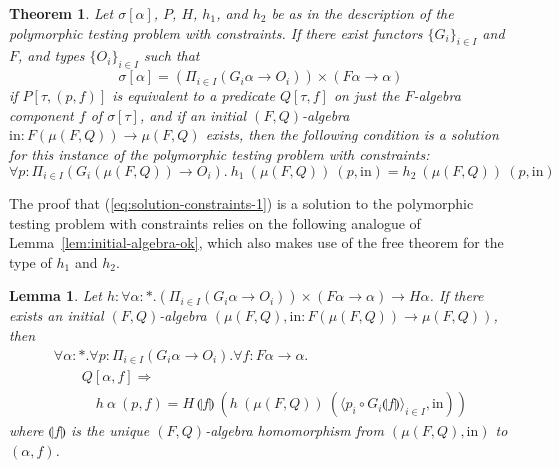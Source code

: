 \documentclass{article}[12 pt]
\newcommand{\fold}[1]{\llparenthesis #1 \rrparenthesis}
\newtheorem{thm}{Theorem}
\newtheorem{lemma}{Lemma}
\theoremstyle{problemstyle}
\begin{document}
\begin{thm}\label{thm:constraints}
Let $\sigma[\alpha]$, $P$, $H$, $h_1$, and $h_2$ be as in the
description of the polymorphic testing problem with constraints. If
there exist functors $\{G_i\}_{i \in I}$ and $F$, and types
$\{O_i\}_{i \in I}$ such that
\begin{equation}
  \label{eq:constraints-type}
  \sigma[\alpha] = \left(\Pi_{i \in I} (G_i \alpha \to O_i)\right)
  \times (F \alpha \to \alpha)
\end{equation}
if $P[\tau, (p,f)]$ is equivalent to a predicate $Q[\tau,f]$ on just
the $F$-algebra component $f$ of $\sigma[\tau]$, and if an initial
$(F,Q)$-algebra $\mathrm{in} : F(\mu(F,Q)) \to \mu(F,Q)$ exists, then
the following condition is a solution for this instance of the
polymorphic testing problem with constraints:
\begin{equation}
  \label{eq:solution-constraints-1}
  \forall p : \Pi_{i \in I}(G_i(\mu (F,Q)) \to O_i).~h_1~(\mu (F,Q))~(p,
  \mathrm{in}) = h_2~(\mu (F,Q))~(p, \mathrm{in}) 
\end{equation}
\end{thm}
\noindent

The proof that (\ref{eq:solution-constraints-1}) is a solution to the
polymorphic testing problem with constraints relies on the following
analogue of Lemma~\ref{lem:initial-algebra-ok}, which also makes use
of the free theorem for the type of $h_1$ and $h_2$.

\begin{lemma}\label{lem:initial-algebra-with-constraints-ok}
  Let $h : \forall \alpha : *. \left(\Pi_{i \in I} (G_i \alpha \to
  O_i)\right) \times (F \alpha \to \alpha) \to H\alpha$. If there
  exists an initial $(F,Q)$-algebra $(\mu (F,Q), \mathrm{in} : F(\mu
  (F,Q)) \to \mu (F,Q))$, then
  \begin{displaymath}
    \begin{array}{l}
      \forall \alpha : *. \forall p : \Pi_{i \in I} (G_i \alpha \to
      O_i). \forall f : F\alpha \to \alpha.\\ \quad\quad Q[\alpha,f]
      \Rightarrow \\ \quad\quad\quad h~\alpha~(p, f) =
      H~\fold{f}~(h~(\mu (F,Q))~(\langle p_i \circ G_i\fold{f}
      \rangle_{i \in I}, \mathrm{in}))
    \end{array}
  \end{displaymath}
where $\fold{f}$ is the unique $(F,Q)$-algebra homomorphism from $(\mu
(F,Q), \mathrm{in})$ to $(\alpha, f)$.
\end{lemma}
\end{document}
